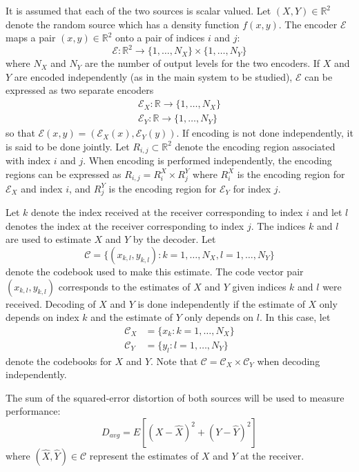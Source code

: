 \documentclass[10pt,twoside,titlepage]{article}
\newcommand{\real}{\mathbb{R}}
\begin{document}
It is assumed that each of the two sources is scalar valued. Let $(X,Y)\in\real^2$ denote the random source which has a density function $f(x,y)$. The encoder $\mathcal{E}$ maps a pair $(x,y) \in \mathbb{R}^2$ onto a pair of indices $i$ and $j$:
\begin{equation*}
    \mathcal{E} : \real^2\to\{1,\ldots,N_X\} \times \{1,\ldots,N_Y\}
\end{equation*}
where $N_X$ and $N_Y$ are the number of output levels for the two encoders. If $X$ and $Y$ are encoded independently (as in the main system to be studied), $\mathcal{E}$ can be expressed as two separate encoders
\begin{gather*}
    \mathcal{E}_X : \real\to\{1,\ldots,N_X\} \\
    \mathcal{E}_Y : \real\to\{1,\ldots,N_Y\}
\end{gather*}
so that $\mathcal{E}(x,y) = (\mathcal{E}_X(x), \mathcal{E}_Y(y))$. If encoding is not done independently, it is said to be done jointly. Let $R_{i,j} \subset \mathbb{R}^2$ denote the encoding region associated with index $i$ and $j$. When encoding is performed independently, the encoding regions can be expressed as $R_{i,j} = R_i^X \times R_j^Y$ where $R_i^X$ is the encoding region for $\mathcal{E}_X$ and index $i$, and $R_j^Y$ is the encoding region for $\mathcal{E}_Y$ for index $j$.

Let $k$ denote the index received at the receiver corresponding to index $i$ and let $l$ denotes the index at the receiver corresponding to index $j$. The indices $k$ and $l$ are used to estimate $X$ and $Y$ by the decoder. Let 
\begin{equation}
\mathcal{C} = \{ (x_{k,l},y_{k,l}) : k = 1,\ldots,N_X, l = 1,\ldots,N_Y\}
\end{equation}
denote the codebook used to make this estimate. The code vector pair $(x_{k,l},y_{k,l})$ corresponds to the estimates of $X$ and $Y$ given indices $k$ and $l$ were received. Decoding of $X$ and $Y$ is done independently if the estimate of $X$ only depends on index $k$ and the estimate of $Y$ only depends on $l$. In this case, let
\begin{align}
\mathcal{C}_X &= \{x_k : k = 1,\ldots,N_X\} \\
\mathcal{C}_Y &= \{y_l : l = 1,\ldots,N_Y\}
\end{align}
denote the codebooks for $X$ and $Y$. Note that $\mathcal{C} = \mathcal{C}_X \times \mathcal{C}_Y$ when decoding independently.

The sum of the squared-error distortion of both sources will be used to measure performance:
\begin{equation}
\label{eq:sys_dist}
    D_{avg} = E[{(X-\hat{X})}^2 + {(Y-\hat{Y})}^2]
\end{equation}
where $(\hat X, \hat Y) \in \mathcal{C}$ represent the estimates of $X$ and $Y$ at the receiver.
\end{document}
